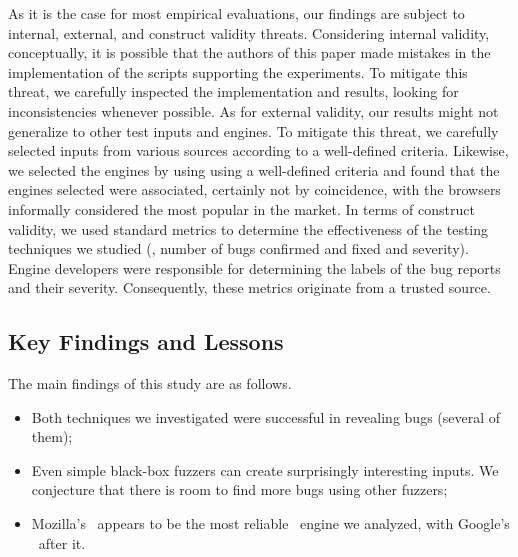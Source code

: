 \documentclass[sigconf,review, anonymous]{acmart}
\begin{document}
As it is the case for most empirical evaluations, our findings are
subject to internal, external, and construct validity
threats. Considering internal validity, conceptually, it is possible
that the authors of this paper made mistakes in the implementation of
the scripts supporting the experiments. To mitigate this threat, we
carefully inspected the implementation and results, looking for
inconsistencies whenever possible. As for external validity, our
results might not generalize to other test inputs and engines. To
mitigate this threat, we carefully selected inputs from various
sources according to a well-defined criteria. Likewise, we selected
the engines by using using a well-defined criteria and found that the
engines selected were associated, certainly not by coincidence, with
the browsers informally considered the most popular in the market. In
terms of construct validity, we used standard metrics to determine the
effectiveness of the testing techniques we studied (\eg{}, number of
bugs confirmed and fixed and severity). Engine developers were
responsible for determining the labels of the bug reports and their
severity. Consequently, these metrics originate from a trusted source.


\subsection{Key Findings and Lessons}
\label{sec:lessons}

The main findings of this study are as follows.

\begin{itemize}
  \item Both techniques we investigated were successful in revealing
    bugs (several of them);
  \item Even simple black-box fuzzers can create surprisingly
    interesting inputs. We conjecture that there is room to find more
    bugs using other fuzzers;
  \item Mozilla's \smonkey\ appears to be the most reliable
    \js\ engine we analyzed, with Google's \veight\ after it.
\end{itemize}
\end{document}
